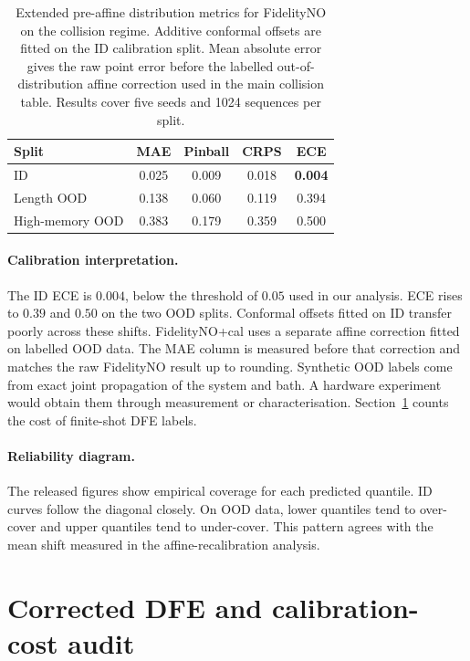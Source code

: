 \documentclass[10pt]{article}
\begin{document}
\begin{table}[h]
\centering
\caption{Extended pre-affine distribution metrics for FidelityNO on the collision regime. Additive conformal offsets are fitted on the ID calibration split. Mean absolute error gives the raw point error before the labelled out-of-distribution affine correction used in the main collision table. Results cover five seeds and 1024 sequences per split.}
\label{tab:supp_calibration}
\begin{tabular}{lcccc}
\toprule
Split & MAE & Pinball & CRPS & ECE \\
\midrule
ID & 0.025 & 0.009 & 0.018 & \textbf{0.004} \\
Length OOD & 0.138 & 0.060 & 0.119 & 0.394 \\
High-memory OOD & 0.383 & 0.179 & 0.359 & 0.500 \\
\bottomrule
\end{tabular}
\end{table}

\paragraph*{Calibration interpretation.}
The ID ECE is $0.004$, below the threshold of $0.05$ used in our analysis. ECE rises to $0.39$ and $0.50$ on the two OOD splits. Conformal offsets fitted on ID transfer poorly across these shifts. FidelityNO+cal uses a separate affine correction fitted on labelled OOD data. The MAE column is measured before that correction and matches the raw FidelityNO result up to rounding. Synthetic OOD labels come from exact joint propagation of the system and bath. A hardware experiment would obtain them through measurement or characterisation. Section~\ref{supp:sample_complexity} counts the cost of finite-shot DFE labels.

\paragraph*{Reliability diagram.}
The released figures show empirical coverage for each predicted quantile. ID curves follow the diagonal closely. On OOD data, lower quantiles tend to over-cover and upper quantiles tend to under-cover. This pattern agrees with the mean shift measured in the affine-recalibration analysis.


\section{Corrected DFE and calibration-cost audit}
\label{supp:sample_complexity}
\end{document}
